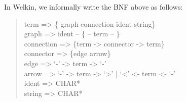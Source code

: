 In Welkin, we informally write the BNF above as follows:
\begin{quote}{\ttfamily \raggedright \noindent
	term => \{ graph connection ident string\}\\
	graph => {ident} -- \{ -- term -- \}\\
	connection => \{term -> connector -> term\}\\
	connector => \{edge arrow\}\\
	edge => `-' -> term -> `-' \\
	arrow =>  `-' -> term -> `>' | `<' <- term <- `-' \\
	ident => CHAR*\\
    string => CHAR*\\
}\end{quote}

